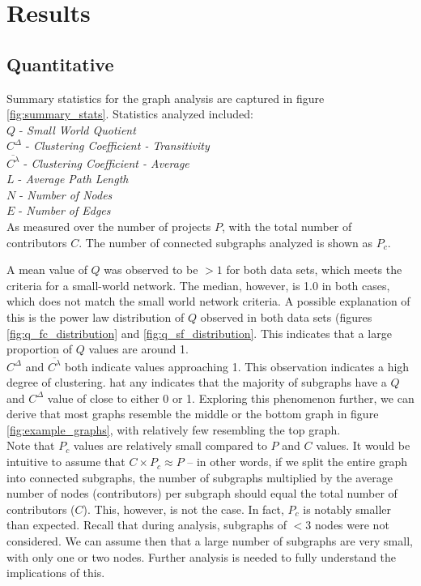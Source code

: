 \documentclass{proc}
\begin{document}
\section{Results}

\subsection{Quantitative}




Summary statistics for the graph analysis are captured in figure \ref{fig:summary_stats}.  Statistics analyzed included:\\
$Q$ - \textit{Small World Quotient}\\
$C^\Delta$ - \textit{Clustering Coefficient - Transitivity}\\
$\overline{C^\lambda}$ - \textit{Clustering Coefficient - Average}\\
$L$ - \textit{Average Path Length}\\
$N$ - \textit{Number of Nodes}\\
$E$ - \textit{Number of Edges}\\
As measured over the number of projects $P$, with the total number of contributors $C$. The number of connected subgraphs analyzed is shown as $P_c$.

A mean value of $Q$ was observed to be $> 1$ for both data sets, which meets the criteria for a small-world network\cite{humphries2008network}. The median, however, is 1.0 in both cases, which does not match the small world network criteria. A possible explanation of this is the power law distribution of $Q$ observed in both data sets (figures \ref{fig:q_fc_distribution} and \ref{fig:q_sf_distribution}. This indicates that a large proportion of $Q$ values are around 1.\\

$C^\Delta$ and $\overline{C^\lambda}$ both indicate values approaching 1. This observation indicates a high degree of clustering\cite{watts1998collective}. hat any indicates that the majority of subgraphs have a $Q$ and $C^\Delta$ value of close to either 0 or 1. Exploring this phenomenon further, we can derive that most graphs resemble the middle or the bottom graph in figure \ref{fig:example_graphs}, with relatively few resembling the top graph.\\

Note that $P_c$ values are relatively small compared to $P$ and $C$ values. It would be intuitive to assume that {$C \times P_c \approx P$} -- in other words, if we split the entire graph into connected subgraphs, the number of subgraphs multiplied by the average number of nodes (contributors) per subgraph should equal the total number of contributors ($C$). This, however, is not the case. In fact, $P_c$ is notably smaller than expected. Recall that during analysis, subgraphs of {$< 3$} nodes were not considered. We can assume then that a large number of subgraphs are very small, with only one or two nodes. Further analysis is needed to fully understand the implications of this.
\end{document}
